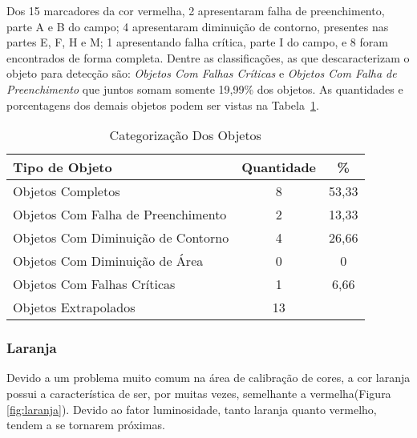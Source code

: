 		
Dos 15 marcadores da cor vermelha, 2 apresentaram falha de preenchimento, parte A e B do campo; 4 apresentaram diminuição de contorno, presentes nas partes E, F, H e M; 1 apresentando falha crítica, parte I do campo, e 8 foram encontrados de forma completa.  
Dentre as classificações, as que 
descaracterizam o objeto para detecção são: \textit{Objetos Com Falhas Críticas} e \textit{Objetos Com Falha de Preenchimento} que juntos somam somente 19,99\% dos objetos. As quantidades e porcentagens dos demais objetos podem ser vistas na Tabela~\ref{tab:vermelho}.
	
	\begin{table}[H]
\centering
\begin{tabular}{l|c|c}
Tipo de Objeto & Quantidade  & \% \\ %
\hline                               %
Objetos Completos &  8 & 53,33 \\
\hline 
Objetos Com Falha de Preenchimento & 2 & 13,33 \\
\hline 
Objetos Com Diminuição de Contorno &  4 & 26,66 \\
\hline 
Objetos Com Diminuição de Área &  0  & 0 \\
\hline 
Objetos Com Falhas Críticas &  1 & 6,66\\
\hline \hline 
Objetos Extrapolados &  13 \\
\hline 
\end{tabular}
\caption{Categorização Dos Objetos}
\label{tab:vermelho}
\end{table}



\subsubsection{Laranja}

	
	Devido a um problema muito comum na área de calibração de cores, a cor laranja possui a característica de ser, por muitas vezes, semelhante a vermelha(Figura \ref{fig:laranja}). Devido ao fator luminosidade, tanto laranja quanto vermelho, tendem a se tornarem próximas.
		
